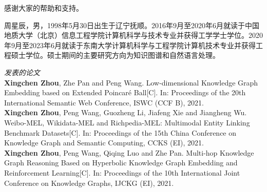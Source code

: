\documentclass[algorithmlist, AutoFakeBold, AutoFakeSlant, figurelist, tablelist, nomlist, engineering]{seuthesix}
\begin{document}
\acknowledgement
感谢大家的帮助和支持。


% 
% 
% 


\appendix
{}
周星辰，男，1998年5月30日出生于辽宁抚顺。2016年9月至2020年6月就读于中国地质大学（北京）信息工程学院计算机科学与技术专业并获得工学学士学位。2020年9月至2023年6月就读于东南大学计算机科学与工程学院计算机技术专业并获得工程硕士学位。硕士期间的主要研究方向为知识图谱和自然语言处理。
\begin{flushleft}
  \textit{\large 发表的论文}\\ 
  \relax[1] \textbf{Xingchen Zhou}, Zhe Pan and Peng Wang. Low-dimensional Knowledge Graph Embedding based on Extended Poincaré Ball[C]. In: Proceedings of the 20th International Semantic Web Conference, ISWC (CCF B), 2021.\\
  \relax[2] \textbf{Xingchen Zhou}, Peng Wang, Guozheng Li, Jiafeng Xie and Jiangheng Wu. Weibo-MEL, Wikidata-MEL and Richpedia-MEL: Multimodal Entity Linking Benchmark Datasets[C]. In: Proceedings of the 15th China Conference on Knowledge Graph and Semantic Computing, CCKS (EI), 2021.\\
  \relax[3] \textbf{Xingchen Zhou}, Peng Wang, Qiqing Luo and Zhe Pan. Multi-hop Knowledge Graph Reasoning Based on Hyperbolic Knowledge Graph Embedding and Reinforcement Learning[C]. In: Proceedings of the 10th International Joint Conference on Knowledge Graphs, IJCKG (EI), 2021.\\

  
\end{flushleft}
\end{document}
